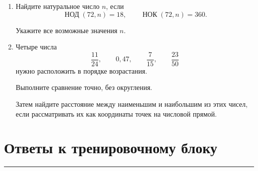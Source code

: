 \documentclass[a4paper,12pt]{article}
\newcommand{\sectionline}{
  \par
  \vspace{-0.35em}
  {\color{accent}\rule{\linewidth}{0.5pt}}
  \vspace{0.55em}
}
\newcommand{\nodmath}{
  \mathop{\mbox{НОД}}\nolimits
}
\newcommand{\nokmath}{
  \mathop{\mbox{НОК}}\nolimits
}
\begin{document}
\begin{enumerate}[label=\textbf{\arabic*.},leftmargin=*]
  Найдите расстояние $MN$
  и координату середины отрезка $MN$.

  Затем проверьте, что найденная середина
  равноудалена от $M$ и $N$.

  \item
  Найдите натуральное число $n$, если
  \[
  \nodmath(72,n)=18,
  \qquad
  \nokmath(72,n)=360.
  \]

  Укажите все возможные значения $n$.


  \item
  Четыре числа
  \[
  \frac{11}{24},
  \qquad
  0,47,
  \qquad
  \frac{7}{15},
  \qquad
  \frac{23}{50}
  \]
  нужно расположить в порядке возрастания.

  Выполните сравнение точно, без округления.

  Затем найдите расстояние между наименьшим
  и наибольшим из этих чисел,
  если рассматривать их как координаты точек
  на числовой прямой.

\end{enumerate}


\clearpage

\section*{Ответы к тренировочному блоку}
\sectionline

\renewcommand{\arraystretch}{1.35}
\end{document}
